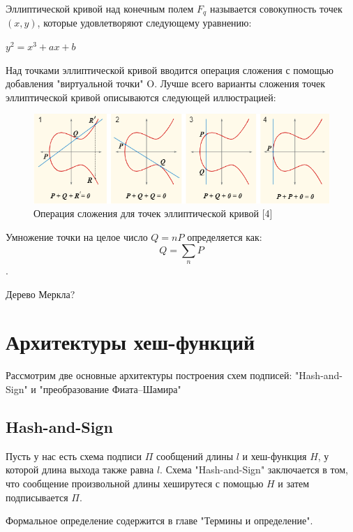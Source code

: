\documentclass[colorthm]{./civarticle}
\begin{document}
\begin{definition}
    Эллиптической кривой над конечным полем $F_q$ называется совокупность точек $(x, y)$, которые удовлетворяют следующему уравнению:

    $y^2 = x^3 + ax + b$

    Над точками эллиптической кривой вводится операция сложения с помощью добавления "виртуальной точки" O. Лучше всего варианты сложения точек эллиптической кривой описываются следующей иллюстрацией:

    \begin{figure}[H]
        \centering
        \includegraphics[width=0.75\linewidth]{ECClines-2.0.png}
        \caption{Операция сложения для точек эллиптической кривой [4]}
        \label{fig:enter-label}
    \end{figure}

    Умножение точки на целое число $Q=nP$ определяется как:
    \begin{displaymath}Q = \sum_{n} P\end{displaymath}.

\end{definition}

\begin{definition}
    Дерево Меркла?
\end{definition}


\section{Архитектуры хеш-функций}
Рассмотрим две основные архитектуры построения схем подписей: "Hash-and-Sign" и "преобразование Фиата–Шамира"

\subsection{Hash-and-Sign}

Пусть у нас есть схема подписи $\Pi$ сообщений длины $l$ и хеш-функция $H$, у которой длина выхода также равна $l$. Схема "Hash-and-Sign" заключается в том, что сообщение произвольной длины хеширутеся с помощью $H$ и затем подписывается $\Pi$.

Формальное определение содержится в главе "Термины и определение".
\end{document}
